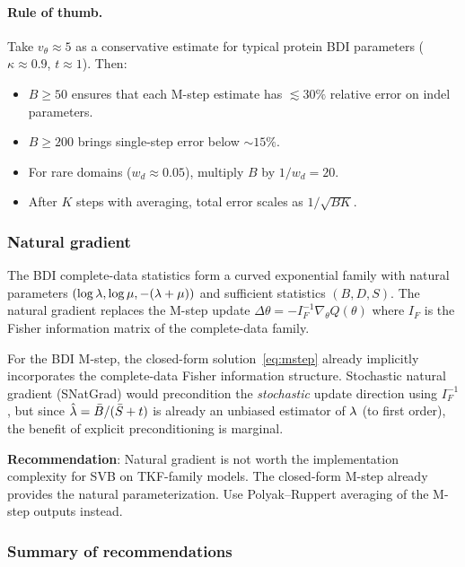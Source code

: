 \paragraph{Rule of thumb.}
Take $v_\theta \approx 5$ as a conservative estimate for typical protein
BDI parameters ($\kappa \approx 0.9$, $t \approx 1$).
Then:
\begin{itemize}
\item $B \geq 50$ ensures that each M-step estimate has
  $\lesssim 30\%$ relative error on indel parameters.
\item $B \geq 200$ brings single-step error below $\sim 15\%$.
\item For rare domains ($w_d \approx 0.05$), multiply $B$ by $1/w_d = 20$.
\item After $K$ steps with averaging, total error scales as $1/\sqrt{BK}$.
\end{itemize}

\subsubsection{Natural gradient}

The BDI complete-data statistics form a curved exponential family
with natural parameters $(\log\lambda, \log\mu, -(\lambda+\mu))$
and sufficient statistics $(B, D, S)$.
The natural gradient replaces the M-step update
$\Delta\theta = -I_F^{-1} \nabla_\theta Q(\theta)$
where $I_F$ is the Fisher information matrix of the complete-data family.

For the BDI M-step, the closed-form solution~\eqref{eq:mstep} already
implicitly incorporates the complete-data Fisher information structure.
Stochastic natural gradient (SNatGrad) would precondition the
\emph{stochastic} update direction using $I_F^{-1}$, but since
$\hat{\lambda} = \bar B / (\bar S + t)$ is already an unbiased estimator
of $\lambda$ (to first order), the benefit of explicit preconditioning
is marginal.

\textbf{Recommendation}: Natural gradient is not worth the implementation
complexity for SVB on TKF-family models.  The closed-form M-step
already provides the natural parameterization.
Use Polyak--Ruppert averaging of the M-step outputs instead.

\subsubsection{Summary of recommendations}

